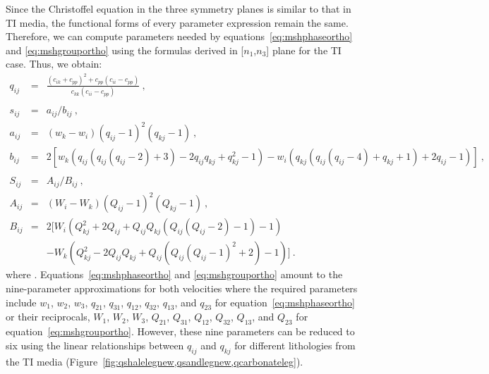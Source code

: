 Since the Christoffel equation in the three symmetry planes is similar to that in TI media, the functional forms of every parameter expression remain the same. Therefore, we can compute parameters needed by equations~\ref{eq:mshphaseortho} and \ref{eq:mshgrouportho} using the formulas derived in [$n_1$,$n_3$] plane for the TI case. Thus, we obtain:
\begin{eqnarray}
\label{eq:qij}
 q_{ij} & = & \frac{(c_{ik}+c_{pp})^2+c_{pp}(c_{ii}-c_{pp})}{c_{kk}(c_{ii}-c_{pp})}~, \\ \nonumber \\
  \label{eq:sij}
 s_{ij} & = & a_{ij}/b_{ij}~, \\
 \nonumber
 a_{ij} & = & (w_k-w_i)(q_{ij}-1)^2(q_{kj}-1)~, \\
 \nonumber
 b_{ij}  & = & 2[w_k(q_{ij}(q_{ij}(q_{ij}-2)+3)-2q_{ij}q_{kj}+q_{kj}^2-1) - w_i(q_{kj}(q_{ij}(q_{ij}-4)+q_{kj}+1) +2q_{ij} -1 )]~,\\ \nonumber \\
   \label{eq:Sij}
 S_{ij} & = & A_{ij}/B_{ij}~, \\
  \nonumber
 A_{ij} & = & (W_i-W_k)(Q_{ij}-1)^2(Q_{kj}-1)~, \\
 \nonumber
 B_{ij}  & = & 2[W_i(Q_{kj}^2 +2Q_{ij} +Q_{ij}Q_{kj}(Q_{ij}(Q_{ij}-2)-1)-1)  \\
 \nonumber
 	  &   & - W_k(Q_{kj}^2-2Q_{ij}Q_{kj}+Q_{ij}(Q_{ij}(Q_{ij}-1)^2+2)-1)]~.
\end{eqnarray}
where  .  Equations~\ref{eq:mshphaseortho} and \ref{eq:mshgrouportho} amount to the nine-parameter approximations for both velocities where the required parameters include $w_1$, $w_2$, $w_3$, $q_{21}$, $q_{31}$, $q_{12}$, $q_{32}$, $q_{13}$, and $q_{23}$ for equation~\ref{eq:mshphaseortho} or their reciprocals, $W_1$, $W_2$, $W_3$, $Q_{21}$, $Q_{31}$, $Q_{12}$, $Q_{32}$, $Q_{13}$, and $Q_{23}$ for equation~\ref{eq:mshgrouportho}. However, these nine parameters can be  reduced to six using the linear relationships between $q_{ij}$ and $q_{kj}$ for different lithologies from the  TI media (Figure~\ref{fig:qshalelegnew,qsandlegnew,qcarbonateleg}).

